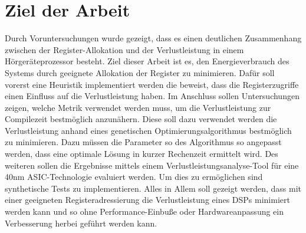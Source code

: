 \section{Ziel der Arbeit}
\label{sec:ziele}
Durch Voruntersuchungen wurde gezeigt, dass es einen deutlichen Zusammenhang zwischen der Register-Allokation und der Verlustleistung in einem Hörgeräteprozessor besteht. Ziel dieser Arbeit ist es, den Energieverbrauch des Systems durch geeignete Allokation der Register zu minimieren. Dafür soll vorerst eine Heuristik implementiert werden die beweist, dass die Registerzugriffe einen Einfluss auf die Verlustleistung haben. Im Anschluss sollen Untersuchungen zeigen, welche Metrik verwendet werden muss, um die Verlustleistung zur Compilezeit bestmöglich anzunähern. Diese soll dazu verwendet werden die Verlustleistung anhand eines genetischen Optimierungsalgorithmus bestmöglich zu minimieren. Dazu müssen die Parameter so  des Algorithmus so angepasst werden, dass eine optimale Lösung in kurzer Rechenzeit ermittelt wird. Des weiteren sollen die Ergebnisse mittels einem Verlustleistungsanalyse-Tool für eine 40nm ASIC-Technologie evaluiert werden. Um dies zu ermöglichen sind synthetische Tests zu implementieren. Alles in Allem soll gezeigt werden, dass mit einer geeigneten Registeradressierung die Verlustleistung eines DSPs minimiert werden kann und so ohne Performance-Einbuße oder Hardwareanpassung ein Verbesserung herbei geführt werden kann.

%

